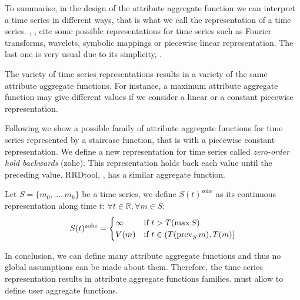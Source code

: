 
To summarise, in the design of the attribute aggregate function we can
interpret a time series in different ways, that is what we call the
representation of a time series. \citeauthor{last:keogh},
\cite{last:keogh}, cite some possible representations for time series
such as Fourier transforms, wavelets, symbolic mappings or piecewise
linear representation. The last one is very usual due to its
simplicity, \cite{keogh01}.

The variety of time series representations results in a variety of the
same attribute aggregate functions. For instance, a maximum attribute
aggregate function may give different values if we consider a linear
or a constant piecewise representation.

Following we show a possible family of attribute aggregate functions
for time series represented by a staircase function, that is with a
piecewise constant representation.  We define a new representation for
time series called \emph{zero-order hold backwards} (zohe). This
representation holds back each value until the preceding value. 
RRDtool, \cite{lisa98:oetiker}, has a similar aggregate function.

Let $S=\{m_0,\ldots,m_k\}$ be a time series, we define
$S(t)^{\text{zohe}}$ as its continuous representation along time $t$:
$\forall t \in \mathbb{R} ,\forall m \in S:$
\begin{equation}
 S(t)^{\text{zohe}} =  
\begin{cases}
  \infty & \text{if } t > T(\max S) \\
  V(m)   & \text{if } t\in (T(\operatorname*{prev}_S m),T(m)]
\end{cases}
\label{eq:zohe}
\end{equation}

In conclusion, we can define many attribute aggregate functions and
thus no global assumptions can be made about them.  Therefore, the
time series representation results in attribute aggregate functions
families.   must allow to define user aggregate functions.








